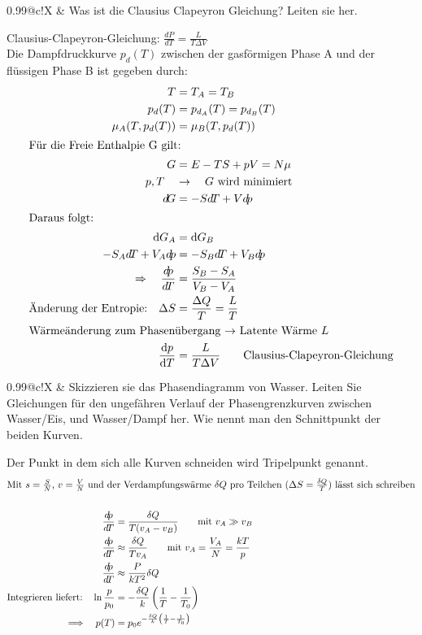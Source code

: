 \documentclass[a4paper,12pt]{scrartcl}
\makeatletter
\def\d{\mathrm{d}}					%
\newcounter{qc}\setcounter{qc}{1}
\newenvironment{fshaded}{
\def\FrameCommand{\fcolorbox{framecolor}{shadecolor}}
\MakeFramed {\FrameRestore}}
{\endMakeFramed}
\def\frage#1{
\begin{fshaded}
\noindent
\begin{tabularx}{0.99\textwidth}{@{}c!{\color{framecolor}\vline}X}
{ \bf \rm \theqc }	&	\noindent #1
\end{tabularx}
\stepcounter{qc}
\end{fshaded}
}
\makeatother
\begin{document}
\frage{Was ist die Clausius Clapeyron Gleichung? Leiten sie her.}
\noindent
	Clausius-Clapeyron-Gleichung: $\frac{d\!P}{d\!T}=\frac{L}{T\Delta V}$\\
	Die Dampfdruckkurve $p_d(T)$ zwischen der gasförmigen Phase A und der flüssigen Phase B ist gegeben durch:
	\begin{align*}
		T&=T_A=T_B\quad \\ p_d(T)&=p_{d_A}(T)=p_{d_B}(T)\\
		\mu_A(T,p_d(T))&=\mu_B(T,p_d(T))\\
		\intertext{Für die Freie Enthalpie G gilt:}\quad G&=E-TS+pV=N\mu\\
		p,T\quad&\rightarrow\quad \text{$G$ wird minimiert}\\
		d\!G&=-Sd\!T+Vd\!p\\
		\intertext{Daraus folgt:}
		\d G_A&=\d G_B\\
		-S_Ad\!T+V_Ad\!p&=-S_Bd\!T+V_Bd\!p\\
		\Rightarrow\quad\frac{d\!p}{d\!T}&=\frac{S_B-S_A}{V_B-V_A}\\
		\text{Änderung der Entropie:}\quad\Delta S&=\frac{\Delta Q}T=\frac LT\\
		\intertext{Wärmeänderung zum Phasenübergang $\rightarrow$ Latente Wärme $L$}
		\frac{\d p}{\d T}&=\frac L{T\Delta V}\qquad\text{Clausius-Clapeyron-Gleichung}
	\end{align*}
	
\frage{Skizzieren sie das Phasendiagramm von Wasser. Leiten Sie Gleichungen für den ungefähren Verlauf der Phasengrenzkurven 
zwischen Wasser/Eis, und Wasser/Dampf her. Wie nennt man den Schnittpunkt der beiden Kurven.}
\noindent
	Der Punkt in dem sich alle Kurven schneiden wird Tripelpunkt genannt.
\begin{align*}
	\intertext{Mit $s=\frac{S}{N}$, $v=\frac{V}{N}$ und der Verdampfungswärme $\delta Q$ pro Teilchen ($\Delta S=\frac{\delta 
Q}{T}$) lässt sich schreiben}\\
	\frac{d\!p}{d\!T}&=\frac{\delta Q}{T(v_A-v_B)}\qquad\text{mit }{v_A}\gg{v_B}\\
	\frac{d\!p}{d\!T}&\approx\frac{\delta Q}{Tv_A}\qquad\text{mit }{v_A}=\frac{V_A}{N}=\frac{kT}{p}\\
	\frac{d\!p}{d\!T}&\approx\frac{P}{kT^2}\delta Q\\
	\text{Integrieren liefert:}\quad\ln\frac{p}{p_0}&=-\frac{\delta Q}{k}\left({\frac{1}{T}-\frac{1}{T_0}}\right)\\
	\Longrightarrow\quad p(T)&=p_0 e^{-\frac{\delta Q}{k}\left({\frac{1}{T}-\frac{1}{T_0}}\right)}\\
\end{align*}
\end{document}
